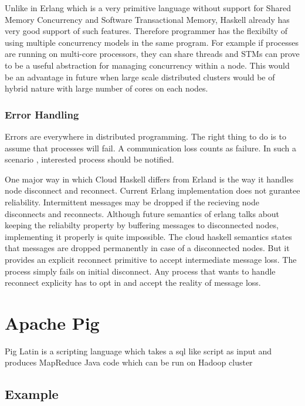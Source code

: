 \documentclass[twoside]{article}
\begin{document}
Unlike in Erlang which is a very primitive language without support
for Shared Memory Concurrency and Software Transactional Memory,
Haskell already has very good support of such features. Therefore
programmer has the flexibilty of using multiple concurrency models in
the same program. For example if processes are running on multi-core
processors, they can share threads and STMs can prove to be a useful
abstraction for managing concurrency within a node. This would be an
advantage in future when large scale distributed clusters would be of
hybrid nature with large number of cores on each nodes.

\subsubsection{Error Handling}
\label{sec:error-handling}

Errors are everywhere in distributed programming. The right thing to
do is to assume that processes will fail. A communication loss counts
as failure. In such a scenario , interested process should be
notified.

One major way in which Cloud Haskell differs from Erland is the way it
handles node disconnect and reconnect. Current Erlang implementation
does not gurantee reliability. Intermittent messages may be dropped if
the recieving node disconnects and reconnects. Although future
semantics of erlang talks about keeping the reliabilty property by
buffering messages to disconnected nodes, implementing it properly is
quite impossible. The cloud haskell semantics states that messages are
dropped permanently in case of a disconnected nodes. But it provides
an explicit reconnect primitive to accept intermediate message loss.
The process simply fails on initial disconnect. Any process that wants
to handle reconnect explicity has to opt in and accept the reality of
message loss.


\section{Apache Pig}
\label{sec:apache-pig}

Pig Latin is a scripting language which takes a sql like script as
input and produces MapReduce Java code which can be run on Hadoop cluster\cite{wiki_pig}

\subsection{Example}
\label{sec:example}
\end{document}
